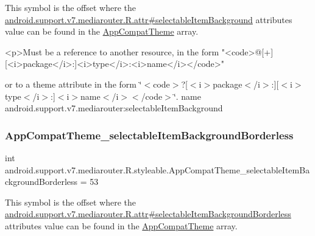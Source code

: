 This symbol is the offset where the \hyperlink{classandroid_1_1support_1_1v7_1_1mediarouter_1_1R_1_1attr_a64acf946f49f574fc151db8f6e8a22f4}{android.\+support.\+v7.\+mediarouter.\+R.\+attr\#selectable\+Item\+Background} attribute\textquotesingle{}s value can be found in the \hyperlink{classandroid_1_1support_1_1v7_1_1mediarouter_1_1R_1_1styleable_a4e3d3900c75d49aeb2f283cac00214d6}{App\+Compat\+Theme} array.

\begin{DoxyVerb}      <p>Must be a reference to another resource, in the form "<code>@[+][<i>package</i>:]<i>type</i>:<i>name</i></code>"
\end{DoxyVerb}
 or to a theme attribute in the form \char`\"{}$<$code$>$?\mbox{[}$<$i$>$package$<$/i$>$\+:\mbox{]}\mbox{[}$<$i$>$type$<$/i$>$\+:\mbox{]}$<$i$>$name$<$/i$>$$<$/code$>$\char`\"{}.  name android.\+support.\+v7.\+mediarouter\+:selectable\+Item\+Background \mbox{\label{classandroid_1_1support_1_1v7_1_1mediarouter_1_1R_1_1styleable_a4b17798c04e6d1bb8e749b5feb1aae89}} 
\subsubsection{\texorpdfstring{App\+Compat\+Theme\+\_\+selectable\+Item\+Background\+Borderless}{AppCompatTheme\_selectableItemBackgroundBorderless}}
{\footnotesize\ttfamily int android.\+support.\+v7.\+mediarouter.\+R.\+styleable.\+App\+Compat\+Theme\+\_\+selectable\+Item\+Background\+Borderless = 53\hspace{0.3cm}{\ttfamily [static]}}

This symbol is the offset where the \hyperlink{classandroid_1_1support_1_1v7_1_1mediarouter_1_1R_1_1attr_af9f31b51ae90ebbc274d859480b076b7}{android.\+support.\+v7.\+mediarouter.\+R.\+attr\#selectable\+Item\+Background\+Borderless} attribute\textquotesingle{}s value can be found in the \hyperlink{classandroid_1_1support_1_1v7_1_1mediarouter_1_1R_1_1styleable_a4e3d3900c75d49aeb2f283cac00214d6}{App\+Compat\+Theme} array.

